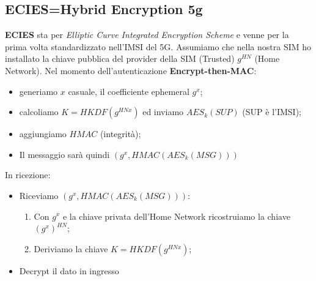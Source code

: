 \documentclass{book}
\begin{document}
\subsection{ECIES=Hybrid Encryption 5g}
\textbf{ECIES} sta per \emph{Elliptic Curve Integrated Encryption Scheme} e venne per la prima volta standardizzato nell'IMSI del 5G\@. Assumiamo che nella nostra SIM ho installato la chiave pubblica del provider della SIM (Trusted) \(g^{HN}\) (Home Network)\@. Nel momento dell'autenticazione \textbf{Encrypt-then-MAC}:\begin{itemize}
	\item generiamo \(x\) casuale, il coefficiente ephemeral \(g^{x}\);
	\item calcoliamo \(K=HKDF(g^{HNx})\) ed inviamo \(AES_{k}(SUP)\) (SUP è l'IMSI);
	\item aggiungiamo \(HMAC\) (integrità);
	\item Il messaggio sarà quindi \(({g}^{x},HMAC(AES_{k}(MSG)))\)
\end{itemize}
In ricezione:\begin{itemize}
	\item Riceviamo \(({g}^{x},HMAC(AES_{k}(MSG)))\):\begin{enumerate}
		      \item Con \({g}^{x}\) e la chiave privata dell'Home Network ricostruiamo la chiave \({(g^{x})}^{HN}\);
		      \item Deriviamo la chiave \(K=HKDF(g^{HNx})\);
	      \end{enumerate}
	\item Decrypt il dato in ingresso
\end{itemize}
\end{document}
